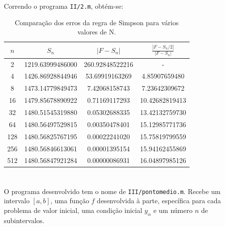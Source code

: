 \documentclass[portuguese, a4paper]{article}
\newcommand\tu[0]{\textunderscore}
\begin{document}
	\subsubsection{} \label{sec:II.2b)}
	\par
	Correndo o programa \texttt{II/2.m}, obtém-se:
	\begin{table}[H]
		\centering
		\begin{tabular}{|c|c|c|c|}
			\hline
			$n$	& $S_n$				& $|F - S_n|$		& $\frac{|F - S_n/2|}{|F - S_n|}$ \\ \hline
			2	& 1219.63999486000	& 260.92848522216	& -					\\ \hline
			4	& 1426.86928844946	& 53.69919163269	& 4.85907659480		\\ \hline
			8	& 1473.14779849473	& 7.42068158743		& 7.23642309672		\\ \hline
			16	& 1479.85678890922	& 0.71169117293		& 10.42682819413	\\ \hline
			32	& 1480.51545319880	& 0.05302688335		& 13.42132759730	\\ \hline
			64	& 1480.56497529815	& 0.00350478401		& 15.12985771736	\\ \hline
			128	& 1480.56825767195	& 0.00022241020		& 15.75819799559	\\ \hline
			256	& 1480.56846613061	& 0.00001395154		& 15.94162455869	\\ \hline
			512	& 1480.56847921284	& 0.00000086931		& 16.04897985126	\\ \hline
		\end{tabular}
		\caption{Comparação dos erros da regra de Simpson para vários valores de N.}
	\end{table}


\section{} \label{sec:III}
	\subsection{} \label{sec:III.1}
	\par
	O programa desenvolvido tem o nome de \texttt{III/ponto\tu medio.m}. Recebe um intervalo
	$[a,b]$, uma função $f$ desenvolvida à parte, específica para cada problema de valor inicial,
	uma condição inicial $ y_\alpha $ e um número $n$ de subintervalos.
\end{document}
